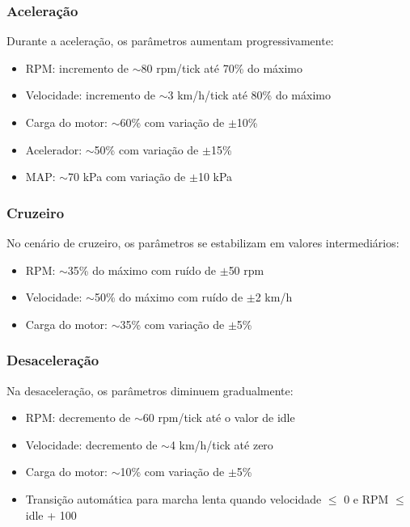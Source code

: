 \subsubsection{Aceleração}

Durante a aceleração, os parâmetros aumentam progressivamente:
\begin{itemize}
    \item RPM: incremento de $\sim$80 rpm/tick até 70\% do máximo
    \item Velocidade: incremento de $\sim$3 km/h/tick até 80\% do máximo
    \item Carga do motor: $\sim$60\% com variação de $\pm$10\%
    \item Acelerador: $\sim$50\% com variação de $\pm$15\%
    \item MAP: $\sim$70 kPa com variação de $\pm$10 kPa
\end{itemize}

\subsubsection{Cruzeiro}

No cenário de cruzeiro, os parâmetros se estabilizam em valores intermediários:
\begin{itemize}
    \item RPM: $\sim$35\% do máximo com ruído de $\pm$50 rpm
    \item Velocidade: $\sim$50\% do máximo com ruído de $\pm$2 km/h
    \item Carga do motor: $\sim$35\% com variação de $\pm$5\%
\end{itemize}

\subsubsection{Desaceleração}

Na desaceleração, os parâmetros diminuem gradualmente:
\begin{itemize}
    \item RPM: decremento de $\sim$60 rpm/tick até o valor de idle
    \item Velocidade: decremento de $\sim$4 km/h/tick até zero
    \item Carga do motor: $\sim$10\% com variação de $\pm$5\%
    \item Transição automática para marcha lenta quando velocidade $\leq$ 0 e RPM $\leq$ idle + 100
\end{itemize}

